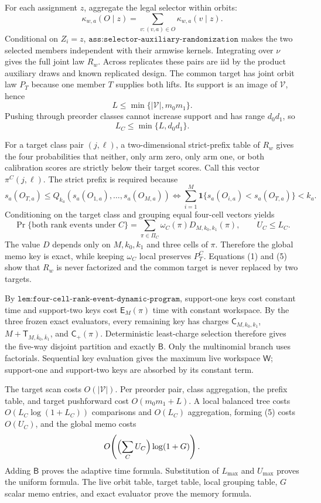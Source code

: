 For each assignment \(z\), aggregate the legal selector within orbits:
\[
\kappa_{w,a}(O\mid z)=\sum_{v:(v,a)\in O}\kappa_{w,a}(v\mid z).
\tag{1}
\]
Conditional on \(Z_i=z\), \(\texttt{ass:selector-auxiliary-randomization}\) makes the two selected members independent with their armwise kernels. Integrating over \(\nu\) gives the full joint law \(R_w\). Across replicates these pairs are iid by the product auxiliary draws and known replicated design. The common target has joint orbit law \(P_T\) because one member \(T\) supplies both lifts. Its support is an image of \(\mathcal V\), hence
\[
L\le\min\{|\mathcal V|,m_0m_1\}.
\tag{2}
\]
Pushing through preorder classes cannot increase support and has range \(d_0d_1\), so
\[
L_C\le\min\{L,d_0d_1\}.
\tag{3}
\]

For a target class pair \((j,\ell)\), a two-dimensional strict-prefix table of \(R_w\) gives the four probabilities that neither, only arm zero, only arm one, or both calibration scores are strictly below their target scores. Call this vector \(\pi^C(j,\ell)\). The strict prefix is required because
\[
s_a(O_{T,a})\le Q_{k_a}(s_a(O_{1,a}),\ldots,s_a(O_{M,a}))
\iff
\sum_{i=1}^M\mathbf 1\{s_a(O_{i,a})<s_a(O_{T,a})\}<k_a.
\tag{4}
\]
Conditioning on the target class and grouping equal four-cell vectors yields
\[
\Pr\{\text{both rank events under }C\}
=\sum_{\pi\in\Pi_C}\omega_C(\pi)D_{M,k_0,k_1}(\pi),
\qquad U_C\le L_C.
\tag{5}
\]
The value \(D\) depends only on \(M,k_0,k_1\) and three cells of \(\pi\). Therefore the global memo key is exact, while keeping \(\omega_C\) local preserves \(P_T^C\). Equations (1) and (5) show that \(R_w\) is never factorized and the common target is never replaced by two targets.

By \(\texttt{lem:four-cell-rank-event-dynamic-program}\), support-one keys cost constant time and support-two keys cost \(\mathsf E_M(\pi)\) time with constant workspace. By the three frozen exact evaluators, every remaining key has charges \(\mathsf C_{M,k_0,k_1}\), \(M+\mathsf T_{M,\bar k_0,\bar k_1}\), and \(\mathsf C_+(\pi)\). Deterministic least-charge selection therefore gives the five-way disjoint partition and exactly \(\mathsf B\). Only the multinomial branch uses factorials. Sequential key evaluation gives the maximum live workspace \(\mathsf W\); support-one and support-two keys are absorbed by its constant term.

The target scan costs \(O(|\mathcal V|)\). Per preorder pair, class aggregation, the prefix table, and target pushforward cost \(O(m_0m_1+L)\). A local balanced tree costs \(O(L_C\log(1+L_C))\) comparisons and \(O(L_C)\) aggregation, forming (5) costs \(O(U_C)\), and the global memo costs
\[
O\!\left(\Bigl(\sum_CU_C\Bigr)\log(1+G)\right).
\]
Adding \(\mathsf B\) proves the adaptive time formula. Substitution of \(L_{\max}\) and \(U_{\max}\) proves the uniform formula. The live orbit table, target table, local grouping table, \(G\) scalar memo entries, and exact evaluator prove the memory formula.

